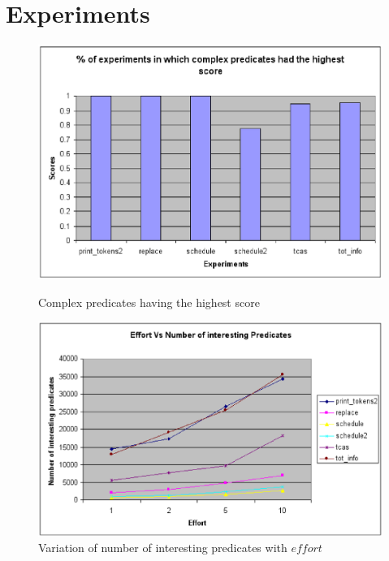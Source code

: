 \section{Experiments}
\label{sec-quant}
\begin{figure}
  \centering
  \includegraphics[width=\columnwidth]{charts/top-pred}
  \label{fig-top-pred}
  \caption{Complex predicates having the highest score}
\end{figure}

\begin{figure}
  \centering
  \includegraphics[width=\columnwidth]{charts/effort}
  \caption{Variation of number of interesting predicates with $effort$}
  \label{fig-effort}
\end{figure}

